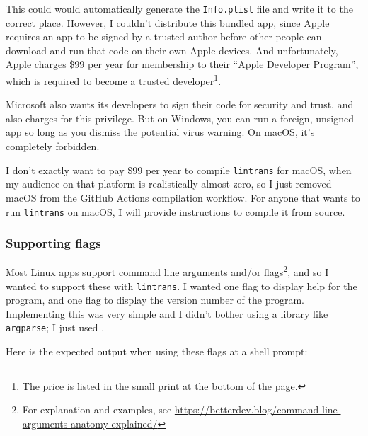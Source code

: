 \documentclass[../development.tex]{subfiles}
\begin{document}

This could would automatically generate the \texttt{Info.plist} file and write it to the correct place. However, I couldn't distribute this bundled app, since Apple requires an app to be signed by a trusted author before other people can download and run that code on their own Apple devices\cite{apple-about-code-signing}. And unfortunately, Apple charges \$99 per year for membership to their \enquote{Apple Developer Program}, which is required to become a trusted developer\cite{apple-developer-program-enrollment}\footnote{The price is listed in the small print at the bottom of the page.}.

Microsoft also wants its developers to sign their code for security and trust, and also charges for this privilege. But on Windows, you can run a foreign, unsigned app so long as you dismiss the potential virus warning. On macOS, it's completely forbidden.

I don't exactly want to pay \$99 per year to compile \texttt{lintrans} for macOS, when my audience on that platform is realistically almost zero, so I just removed macOS from the GitHub Actions compilation workflow. For anyone that wants to run \texttt{lintrans} on macOS, I will provide instructions to compile it from source.

\subsubsection{Supporting flags\label{development:preparing-for-v0.2.1:supporting-flags}}

Most Linux apps support command line arguments and/or flags\footnote{For explanation and examples, see \url{https://betterdev.blog/command-line-arguments-anatomy-explained/}}, and so I wanted to support these with \texttt{lintrans}. I wanted one flag to display help for the program, and one flag to display the version number of the program. Implementing this was very simple and I didn't bother using a library like \texttt{argparse}; I just used .


Here is the expected output when using these flags at a shell prompt:
\end{document}
